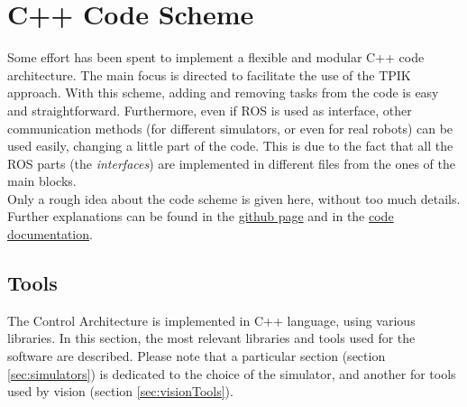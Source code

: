 

\chapter{C++ Code Scheme}
\label{chap:AppendixCode}
\ifpdf
\graphicspath{{Appendix/Figures/PNG/}{Appendix/Figures/PDF/}{Appendix/Figures/}}
\else
\graphicspath{{Appendix/Figures/EPS/}{Appendix/Figures/}}
\fi

Some effort has been spent to implement a flexible and modular C++ code architecture. The main focus is directed to facilitate the use of the TPIK approach. With this scheme, adding and removing tasks from the code is easy and straightforward. Furthermore, even if ROS is used as interface, other communication methods (for different simulators, or even for real robots) can be used easily, changing a little part of the code. This is due to the fact that all the ROS parts (the \textit{interfaces}) are implemented in different files from the ones of the main blocks.\\
Only a rough idea about the code scheme is given here, without too much details. Further explanations can be found in the \href{https://github.com/torydebra/AUV-Coop-Assembly}{github page} and in the \href{https://torydebra.github.io/AUV-Coop-Assembly/}{code documentation}.

\section{Tools}
The Control Architecture is implemented in C++ language, using various libraries. In this section, the most relevant libraries and tools used for the software are described. Please note that a particular section (section \ref{sec:simulators}) is dedicated to the choice of the simulator, and another for tools used by vision (section \ref{sec:visionTools}).


